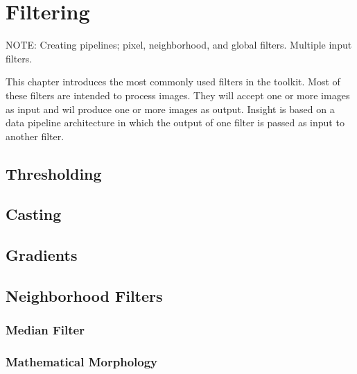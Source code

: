 \chapter{Filtering}

NOTE: Creating pipelines; pixel, neighborhood, and global filters. Multiple input filters.

This chapter introduces the most commonly used filters in the toolkit.  Most of
these filters are intended to process images. They will accept one or more
images as input and wil produce one or more images as output. Insight is based
on a data pipeline architecture in which the output of one filter is passed as
input to another filter.


\section{Thresholding}
\label{sec:ThresholdingFiltering}




\section{Casting}
\label{sec:CastingFiltering}




\section{Gradients}
\label{sec:GradientFiltering}





\section{Neighborhood Filters}
\label{sec:NeighborhoodFilters}

\subsection{Median Filter}
\label{sec:MedianFilter}




\subsection{Mathematical Morphology}
\label{sec:MathematicalMorphology}


